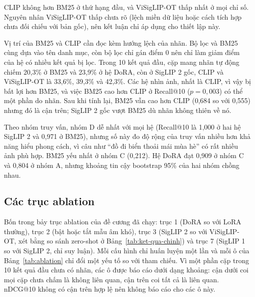 CLIP không hơn BM25 ở thứ hạng đầu, và ViSigLIP-OT thấp nhất ở mọi chỉ số. Nguyên nhân ViSigLIP-OT thấp chưa rõ (lệch miền dữ liệu hoặc cách tích hợp chưa đối chiếu với bản gốc), nên kết luận chỉ áp dụng cho thiết lập này.

Vị trí của BM25 và CLIP cần đọc kèm hướng lệch của nhãn. Bộ lọc và BM25 cùng dựa vào tên danh mục, còn bộ lọc chỉ gán điểm 0 nên chỉ làm giảm điểm của hệ có nhiều kết quả bị lọc. Trong 10 kết quả đầu, cặp mang nhãn tự động chiếm 20,3\% ở BM25 và 23,9\% ở hệ DoRA, còn ở SigLIP 2 gốc, CLIP và ViSigLIP-OT là 33,6\%, 39,3\% và 42,3\%. Các hệ nhìn ảnh, nhất là CLIP, vì vậy bị bất lợi hơn BM25, và việc BM25 cao hơn CLIP ở Recall@10 ($p = 0{,}003$) có thể một phần do nhãn. Sau khi tính lại, BM25 vẫn cao hơn CLIP (0,684 so với 0,555) nhưng đó là cận trên; SigLIP 2 gốc vượt BM25 dù nhãn không thiên về nó.

Theo nhóm truy vấn, nhóm D dễ nhất với mọi hệ (Recall@10 là 1,000 ở hai hệ SigLIP 2 và 0,971 ở BM25), nhưng số này đo độ rộng của truy vấn nhiều hơn khả năng hiểu phong cách, vì câu như ``đồ đi biển thoải mái mùa hè'' có rất nhiều ảnh phù hợp. BM25 yếu nhất ở nhóm C (0,212). Hệ DoRA đạt 0,909 ở nhóm C và 0,804 ở nhóm A, nhưng khoảng tin cậy bootstrap 95\% của hai nhóm chồng nhau.

\subsection{Các trục ablation}
\label{sec:ablation}

Bốn trong bảy trục ablation của đề cương đã chạy: trục 1 (DoRA so với LoRA thường), trục 2 (bật hoặc tắt mẫu âm khó), trục 3 (SigLIP 2 so với ViSigLIP-OT, xét bằng so sánh zero-shot ở Bảng~\ref{tab:ket-qua-chinh}) và trục 7 (SigLIP 1 so với SigLIP 2, chỉ suy luận). Mỗi cấu hình chỉ huấn luyện một lần và mỗi ô của Bảng~\ref{tab:ablation} chỉ đổi một yếu tố so với tham chiếu. Vì một phần cặp trong 10 kết quả đầu chưa có nhãn, các ô được báo cáo dưới dạng khoảng: cận dưới coi mọi cặp chưa chấm là không liên quan, cận trên coi tất cả là liên quan. nDCG@10 không có cận trên hợp lệ nên không báo cáo cho các ô này.


